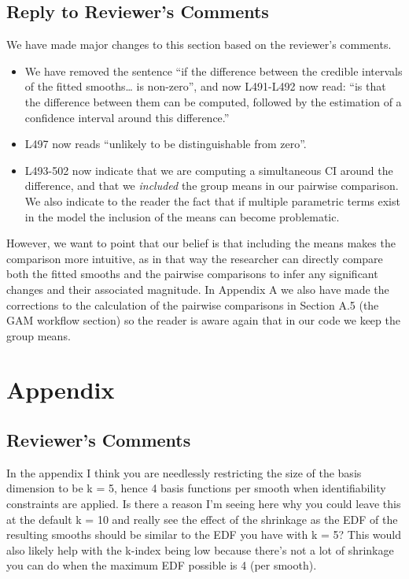\documentclass[
]{article}
\begin{document}
\hypertarget{section-9}{%
\subsection{\texorpdfstring{\textcolor{reviewersblue} {Reply to Reviewer's Comments}}{}}\label{section-9}}

We have made major changes to this section based on the reviewer's comments.

\begin{itemize}
\item
  We have removed the sentence ``if the difference between the credible intervals of the fitted smooths\ldots{} is non-zero'', and now L491-L492 now read: ``is that the difference between them can be computed, followed by the estimation of a confidence interval around this difference.''
\item
  L497 now reads ``unlikely to be distinguishable from zero''.
\item
  L493-502 now indicate that we are computing a simultaneous CI around the difference, and that we \emph{included} the group means in our pairwise comparison. We also indicate to the reader the fact that if multiple parametric terms exist in the model the inclusion of the means can become problematic.
\end{itemize}

However, we want to point that our belief is that including the means makes the comparison more intuitive, as in that way the researcher can directly compare both the fitted smooths and the pairwise comparisons to infer any significant changes and their associated magnitude. In Appendix A we also have made the corrections to the calculation of the pairwise comparisons in Section A.5 (the GAM workflow section) so the reader is aware again that in our code we keep the group means.

\hypertarget{appendix}{%
\section{Appendix}\label{appendix}}

\hypertarget{reviewers-comments-9}{%
\subsection{Reviewer's Comments}\label{reviewers-comments-9}}

In the appendix I think you are needlessly restricting the size of the basis dimension to be k = 5, hence 4 basis functions per smooth when identifiability constraints are applied. Is there a reason I'm seeing here why you could leave this at the default k = 10 and really see the effect of the shrinkage as the EDF of the resulting smooths should be similar to the EDF you have with k = 5? This would also likely help with the k-index being low because there's not a lot of shrinkage you can do when the maximum EDF possible is 4 (per smooth).
\end{document}
